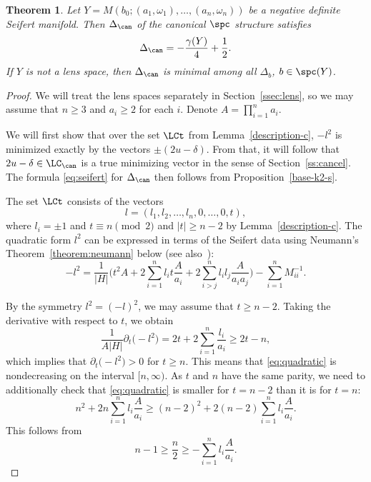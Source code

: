 \documentclass[10pt,a4paper]{amsart}
\newcounter{theorem}
\newtheorem{Theorem}{Theorem}[section]
\begin{document}
\begin{Theorem}\label{thm:seifert}
Let $Y = M(b_0;(a_1, \omega_1), \dots, (a_n, \omega_n))$ be a negative definite Seifert manifold. Then $\Delta_{\can}$ of the canonical $\spc$ structure satisfies
\begin{equation}\label{eq:seifert}
 \Delta_{\can} = -\frac{\gamma(Y)}{4} + \frac{1}{2}.
\end{equation}
If $Y$ is not a lens space, then $\Delta_{\can}$ is minimal among all $\Delta_b$, $b \in \spc(Y)$.
\end{Theorem}

\begin{proof}
We will treat the lens spaces separately in Section~\ref{ssec:lens}, so we may assume that $n \geq 3$ and $a_i \geq 2$ for each $i$. Denote $A = \prod_{i=1}^n a_i$.

We will first show that over the set $\LCt$ from Lemma~\ref{description-c}, $-l^2$ is minimized exactly by the vectors $\pm(2u-\delta)$. From that, it will follow that $2u-\delta \in \LC_{\can}$ is a true minimizing vector in the sense of Section~\ref{ss:cancel}. The formula \eqref{eq:seifert} for $\Delta_{\can}$ then follows from Proposition~\ref{base-k2-s}.

The set $\LCt$ consists of the vectors
\[
 l = (l_1, l_2, \dots, l_n, 0, \dots, 0, t),
\]
where $l_i = \pm 1$ and $t \equiv n \pmod{2}$ and $\lvert t \rvert \geq n-2$ by Lemma~\ref{description-c}. The quadratic form $l^2$ can be expressed in terms of the Seifert data using Neumann's Theorem~\ref{theorem:neumann}
below (see also~\cite[p.~19]{GKS23}):
\begin{equation}\label{eq:quadratic}
 -l^2 = \frac{1}{|H|} \Biggl(t^2 A + 2 \sum_{i=1}^n l_i t\frac{A}{a_i} +
 2 \sum_{i > j}^n l_i l_j \frac{A}{a_ia_j} \Biggr) - \sum_{i=1}^n M^{-1}_{ii}.
\end{equation}

By the symmetry $l^2 = (-l)^2$, we may assume that $t \geq n-2$. Taking the derivative with respect to $t$, we obtain
\[
\frac{1}{A |H|} \partial_t \bigl(-l^2\bigr) = 2t + 2\sum_{i=1}^n \frac{l_i}{a_i} \geq 2t - n,
\]
which implies that $\partial_t\bigl(-l^2\bigr) >0$ for $t \geq n$. This means that \eqref{eq:quadratic} is nondecreasing on the interval $[n,\infty)$. As $t$ and $n$ have the same parity, we need to additionally check that \eqref{eq:quadratic} is smaller for $t = n-2$ than it is for $t = n$:
\[
n^2+2n \sum_{i=1}^n l_i \frac{A}{a_i} \geq (n-2)^2+2(n-2)\sum_{i=1}^n l_i \frac{A}{a_i}.
\]
This follows from
\[n-1\geq \frac{n}{2} \geq -\sum_{i=1}^n l_i \frac{A}{a_i}.
\]




\end{proof}
\end{document}
